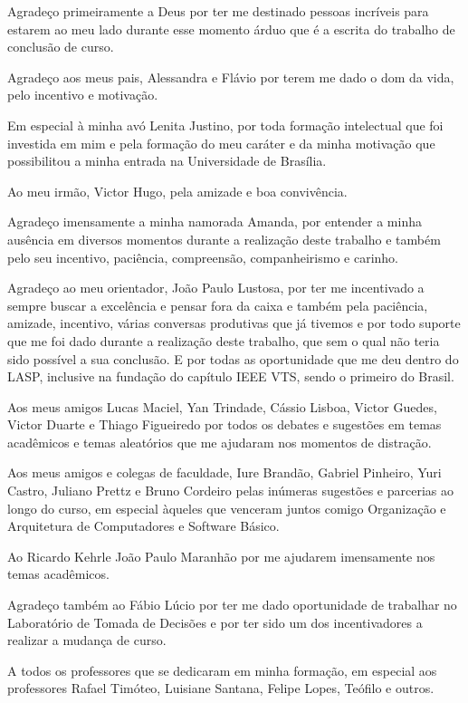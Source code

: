 Agradeço primeiramente a Deus por ter me destinado pessoas incríveis para estarem ao meu lado 
durante esse momento árduo que é a escrita do trabalho de conclusão de curso. 

Agradeço aos meus pais, Alessandra e Flávio por terem me dado o dom da vida, pelo incentivo e motivação.

Em especial à minha avó Lenita Justino, por toda formação 
intelectual que foi investida em mim e pela formação do meu caráter e da minha motivação que possibilitou 
a minha entrada na Universidade de Brasília.

Ao meu irmão, Victor Hugo, pela amizade e boa convivência.

Agradeço imensamente a minha namorada Amanda, por entender a minha ausência em diversos momentos durante a realização deste trabalho
e também pelo seu incentivo, paciência, compreensão, companheirismo e carinho.

Agradeço ao meu orientador, João Paulo Lustosa, por ter me incentivado a sempre buscar a excelência e pensar fora da caixa e também
pela paciência, amizade, incentivo, várias conversas produtivas que já tivemos e por todo suporte que me foi dado durante a realização deste 
trabalho, que sem o qual não teria sido possível a sua conclusão. E por todas as oportunidade que me deu dentro do LASP, inclusive na fundação 
do capítulo IEEE VTS, sendo o primeiro do Brasil.

Aos meus amigos Lucas Maciel, Yan Trindade, Cássio Lisboa, Victor Guedes, Victor Duarte e Thiago Figueiredo por todos os debates e sugestões em temas acadêmicos 
e temas aleatórios que me ajudaram nos momentos de distração.

Aos meus amigos e colegas de faculdade, Iure Brandão, Gabriel Pinheiro, Yuri Castro, Juliano Prettz e 
Bruno Cordeiro pelas inúmeras sugestões e parcerias ao longo do curso, em especial àqueles que venceram juntos comigo Organização e Arquitetura
de Computadores e Software Básico.

Ao Ricardo Kehrle João Paulo Maranhão por me ajudarem imensamente nos temas acadêmicos. 

Agradeço também ao Fábio Lúcio por ter me dado oportunidade de trabalhar no Laboratório de Tomada de Decisões e por ter sido um
dos incentivadores a realizar a mudança de curso.

A todos os professores que se dedicaram em minha formação, em especial aos professores Rafael Timóteo, Luisiane Santana, Felipe Lopes, Teófilo e outros.

